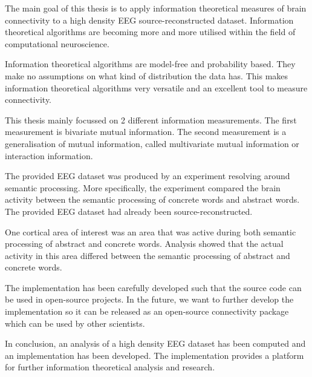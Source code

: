 The main goal of this thesis is to apply information theoretical measures of brain connectivity to a high density EEG source-reconstructed dataset. Information theoretical algorithms are becoming more and more utilised within the field of computational neuroscience. 

Information theoretical algorithms are model-free and probability based. They make no assumptions on what kind of distribution the data has. This makes information theoretical algorithms very versatile and an excellent tool to measure connectivity.

This thesis mainly focussed on 2 different information measurements. The first measurement is bivariate mutual information. The second measurement is a generalisation of mutual information, called multivariate mutual information or interaction information.

The provided EEG dataset was produced by an experiment resolving around semantic processing. More specifically, the experiment compared the brain activity between the semantic processing of concrete words and abstract words. The provided EEG dataset had already been source-reconstructed.

One cortical area of interest was an area that was active during both semantic processing of abstract and concrete words. Analysis showed that the actual activity in this area differed between the semantic processing of abstract and concrete words.

The implementation has been carefully developed such that the source code can be used in open-source projects. In the future, we want to further develop the implementation so it can be released as an open-source connectivity package which can be used by other scientists. 

In conclusion, an analysis of a high density EEG dataset has been computed and an implementation has been developed. The implementation provides a platform for further information theoretical analysis and research.  